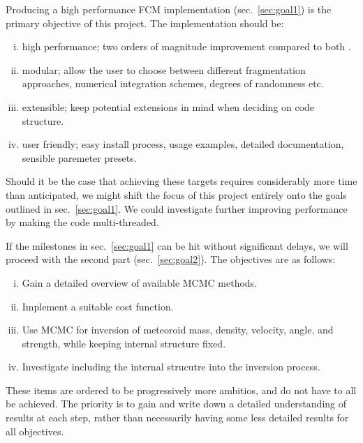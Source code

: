 Producing a high performance FCM implementation (sec.~\ref{sec:goal1}) is the primary objective of this project.
The implementation should be:
\begin{enumerate}[(i)]
    \item high performance; two orders of magnitude improvement compared to both \cite{mehta2015break,newland2019CFM18}.
    \item modular; allow the user to choose between different fragmentation approaches, numerical integration schemes, degrees of randomness etc.
    \item extensible; keep potential extensions in mind when deciding on code structure.
    \item user friendly; easy install process, usage examples, detailed documentation, sensible paremeter presets.
\end{enumerate}

Should it be the case that achieving these targets requires considerably more time than anticipated, we might shift the focus of this project entirely onto the goals outlined in sec.~\ref{sec:goal1}.
We could investigate further improving performance by making the code multi-threaded.

If the milestones in sec.~\ref{sec:goal1} can be hit without significant delays, we will proceed with the second part (sec.~\ref{sec:goal2}). The objectives are as follows:
\begin{enumerate}[(i)]
    \item Gain a detailed overview of available MCMC methods.
    \item Implement a suitable cost function.
    \item Use MCMC for inversion of meteoroid mass, density, velocity, angle, and strength, while keeping internal structure fixed.
    \item Investigate including the internal strucutre into the inversion process.
\end{enumerate}
These items are ordered to be progressively more ambitios, and do not have to all be achieved.
The priority is to gain and write down a detailed understanding of results at each step, rather than necessarily having some less detailed results for all objectives.
